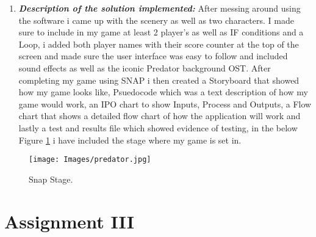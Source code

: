 \documentclass[12pt]{article}
\begin{document}
\begin{enumerate}


\item \textbf{\emph{Description of the solution implemented: }} After messing around using the software i came up with the scenery as well as two characters. I made sure to include in my game at least 2 player's as well as IF conditions and a Loop, i added both player names with their score counter at the top of the screen and made sure the user interface was easy to follow and included sound effects as well as the iconic Predator background OST. After completing my game using SNAP i then created a Storyboard that showed how my game looks like, Psuedocode which was a text description of how my game would work, an IPO chart to show Inputs, Process and Outputs, a Flow chart that shows a detailed flow chart of how the application will work and lastly a test and results file which showed evidence of testing, in the below Figure \ref{fig:Predator} i have included the stage where my game is set in.
\end{enumerate}
\begin{figure}[!th]
  \centering
  \texttt{[image: Images/predator.jpg]}
  \caption{Snap Stage.}
  \label{fig:Predator}
\end{figure}



\section{Assignment III}
\label{sec:assignment3}


\end{document}
